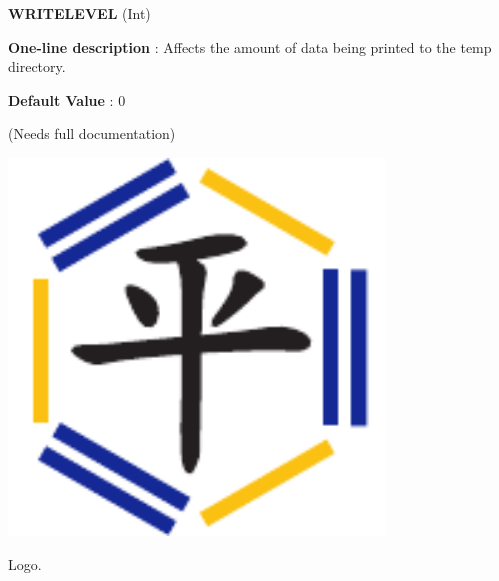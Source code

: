 \begin{DoxyItemize}
\item {\bfseries  W\-R\-I\-T\-E\-L\-E\-V\-E\-L } (Int) \par
{\bfseries  One-\/line description }\-: Affects the amount of data being printed to the temp directory. \par
{\bfseries  Default Value }\-: 0 \par
(Needs full documentation)\end{DoxyItemize}

\begin{DoxyImage}
\includegraphics[height=10cm]{ForceBalance}
\caption{Logo.}
\end{DoxyImage}
 